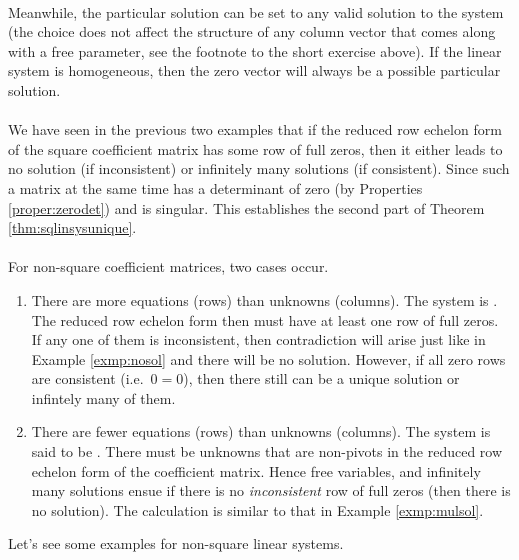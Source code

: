 \\
Meanwhile, the particular solution can be set to any valid solution to the system (the choice does not affect the structure of any column vector that comes along with a free parameter, see the footnote to the short exercise above). If the linear system is homogeneous, then the zero vector will always be a possible particular solution. \\
\\
We have seen in the previous two examples that if the reduced row echelon form of the square coefficient matrix has some row of full zeros, then it either leads to no solution (if inconsistent) or infinitely many solutions (if consistent). Since such a matrix at the same time has a determinant of zero (by Properties \ref{proper:zerodet}) and is singular. This establishes the second part of Theorem \ref{thm:sqlinsysunique}. \\
\\
For non-square coefficient matrices, two cases occur.
\begin{enumerate}
\item There are more equations (rows) than unknowns (columns). The system is . The reduced row echelon form then must have at least one row of full zeros. If any one of them is inconsistent, then contradiction will arise just like in Example \ref{exmp:nosol} and there will be no solution. However, if all zero rows are consistent (i.e.\ $0=0$), then there still can be a unique solution or infintely many of them.
\item There are fewer equations (rows) than unknowns (columns). The system is said to be . There must be unknowns that are non-pivots in the reduced row echelon form of the coefficient matrix. Hence free variables, and infinitely many solutions ensue if there is no \textit{inconsistent} row of full zeros (then there is no solution). The calculation is similar to that in Example \ref{exmp:mulsol}.
\end{enumerate}
Let's see some examples for non-square linear systems.\
